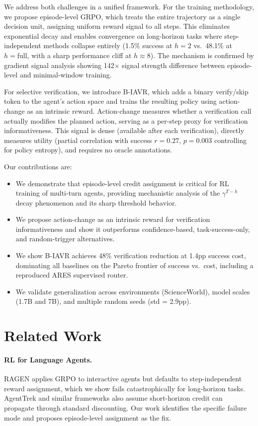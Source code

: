\documentclass[11pt]{article}
\begin{document}
We address both challenges in a unified framework. For the training methodology, we propose episode-level GRPO, which treats the entire trajectory as a single decision unit, assigning uniform reward signal to all steps. This eliminates exponential decay and enables convergence on long-horizon tasks where step-independent methods collapse entirely (1.5\% success at $h=2$ vs.\ 48.1\% at $h=\text{full}$, with a sharp performance cliff at $h \approx 8$). The mechanism is confirmed by gradient signal analysis showing 142$\times$ signal strength difference between episode-level and minimal-window training.

For selective verification, we introduce B-IAVR, which adds a binary verify/skip token to the agent's action space and trains the resulting policy using action-change as an intrinsic reward. Action-change measures whether a verification call actually modifies the planned action, serving as a per-step proxy for verification informativeness. This signal is dense (available after each verification), directly measures utility (partial correlation with success $r=0.27$, $p=0.003$ controlling for policy entropy), and requires no oracle annotations.

Our contributions are:
\begin{itemize}
\item We demonstrate that episode-level credit assignment is critical for RL training of multi-turn agents, providing mechanistic analysis of the $\gamma^{T-h}$ decay phenomenon and its sharp threshold behavior.
\item We propose action-change as an intrinsic reward for verification informativeness and show it outperforms confidence-based, task-success-only, and random-trigger alternatives.
\item We show B-IAVR achieves 48\% verification reduction at 1.4pp success cost, dominating all baselines on the Pareto frontier of success vs.\ cost, including a reproduced ARES supervised router.
\item We validate generalization across environments (ScienceWorld), model scales (1.7B and 7B), and multiple random seeds (std = 2.9pp).
\end{itemize}

\section{Related Work}

\paragraph{RL for Language Agents.}
RAGEN applies GRPO to interactive agents but defaults to step-independent reward assignment, which we show fails catastrophically for long-horizon tasks. AgentTrek and similar frameworks also assume short-horizon credit can propagate through standard discounting. Our work identifies the specific failure mode and proposes episode-level assignment as the fix.
\end{document}
